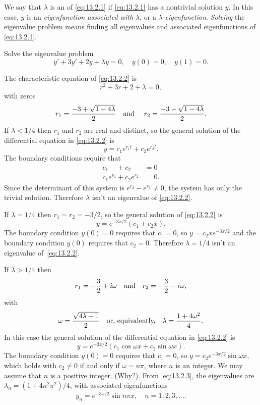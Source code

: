 We say that $\lambda$ is an  of  \eqref{eq:13.2.1} if
\eqref{eq:13.2.1} has a nontrivial solution $y$.   In this case, $y$ is an
\emph{eigenfunction associated with $\lambda$},
or a $\lambda$-\emph{eigenfunction}.
\emph{Solving}  the eigenvalue
problem means finding all eigenvalues and associated eigenfunctions
of \eqref{eq:13.2.1}.


\begin{example}\label{example:13.2.1}
Solve the eigenvalue problem
\begin{equation} \label{eq:13.2.2}
y'+3y'+2y+\lambda y=0,\quad  y(0)=0,\quad y(1)=0.
\end{equation}
\end{example}

\begin{solution}
The characteristic equation of \eqref{eq:13.2.2} is
\[
r^{2}+3r+2+\lambda=0,
\]
with zeros
\[
r_{1}=\frac{-3+\sqrt{1-4\lambda}}{2} \text{\quad   and \quad }
r_{2}=\frac{-3-\sqrt{1-4\lambda}}{2}.
\]
If $\lambda<1/4$ then  $r_{1}$ and $r_{2}$ are real and distinct, so the
general solution of the differential equation in  \eqref{eq:13.2.2} is
\[
y=c_{1}e^{r_{1}t}+c_{2}e^{r_{2}t}.
\]
The boundary conditions require that
\begin{align*}
c_{1}\phantom{e^{r_{1}}}+c_{2}\phantom{e^{r_{2}}}&=0\\
c_{1}e^{r_{1}}+c_{2}e^{r_{2}}&=0.
\end{align*}
Since the determinant of  this system is $e^{r_{2}}-e^{r_{1}}\ne0$, the
system has only the trivial solution. Therefore
$\lambda$ isn't  an eigenvalue of \eqref{eq:13.2.2}.

If $\lambda=1/4$ then $r_{1}=r_{2}=-3/2$, so the general solution of
\eqref{eq:13.2.2} is
\[
y=e^{-3x/2}(c_{1}+c_{2}x).
\]
The boundary condition $y(0)=0$ requires that $c_{1}=0$, so
$y=c_{2}xe^{-3x/2}$ and the boundary condition $y(0)$ requires that
$c_{2}=0$. Therefore $\lambda=1/4$  isn't  an eigenvalue of~\eqref{eq:13.2.2}.

If $\lambda>1/4$ then
\[
r_{1}=-\frac{3}{2}+i\omega \text{\quad   and\quad }
r_{2}=-\frac{3}{2}-i\omega,
\]
with
\begin{equation} \label{eq:13.2.3}
\omega =\frac{\sqrt{4\lambda-1}}{2}
\text{\quad  or, equivalently,\quad }  \lambda=\frac{1+4\omega^{2}}{4}.
\end{equation}
In this case the general solution of the differential equation in
\eqref{eq:13.2.2} is
\[
y=e^{-3x/2}(c_{1}\cos\omega x+c_{2}\sin\omega x).
\]
The boundary condition $y(0)=0$  requires that $c_{1}=0$, so
$y=c_{2}e^{-3x/2}\sin\omega x$, which holds with $c_{2}\ne0$ if and only if
$\omega=n\pi$, where $n$ is an integer. We may assume that $n$
is a positive integer. (Why?). From \eqref{eq:13.2.3}, the eigenvalues are
$\lambda_{n}=(1+4n^{2}\pi^{2})/4$, with associated eigenfunctions
\[
y_{n}=e^{-3x/2}\sin n\pi x,\quad  n=1,2,3,\dots.
\]
\end{solution}

